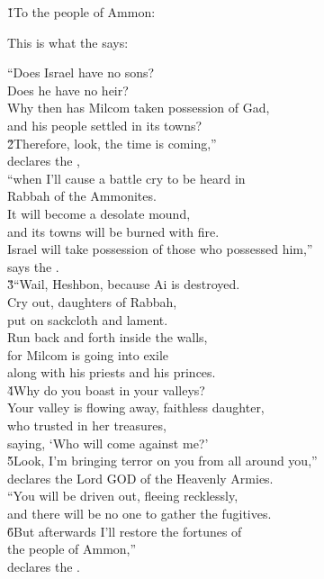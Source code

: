 
\v{1}To the people of Ammon:

This is what the  says:

\begin{poetry}
\poeml ``Does Israel have no sons? \\
\poemll    Does he have no heir? \\
\poeml Why then has Milcom taken possession of Gad, \\
\poemll    and his people settled in its towns? \\
\poeml \v{2}Therefore, look, the time is coming,'' \\
\poemll    declares the , \\
\poeml ``when I'll cause a battle cry to be heard in \\
\poemll    Rabbah of the Ammonites. \\
\poeml It will become a desolate mound, \\
\poemll    and its towns will be burned with fire. \\
\poeml Israel will take possession of those who possessed him,'' \\
\poemll    says the . \\
\poeml \v{3}``Wail, Heshbon, because Ai is destroyed. \\
\poemll    Cry out, daughters of Rabbah, \\
\poemlll       put on sackcloth and lament. \\
\poeml Run back and forth inside the walls, \\
\poemll    for Milcom is going into exile \\
\poemlll       along with his priests and his princes. \\
\poeml \v{4}Why do you boast in your valleys? \\
\poeml Your valley is flowing away, faithless daughter, \\
\poemll    who trusted in her treasures, \\
\poemlll       saying, `Who will come against me?' \\
\poeml \v{5}Look, I'm bringing terror on you from all around you,'' \\
\poemll    declares the Lord GOD of the Heavenly Armies. \\
\poeml ``You will be driven out, fleeing recklessly, \\
\poemll    and there will be no one to gather the fugitives. \\
\poeml \v{6}But afterwards I'll restore the fortunes of \\
\poemll    the people of Ammon,'' \\
\poemlll       declares the .
\end{poetry}

